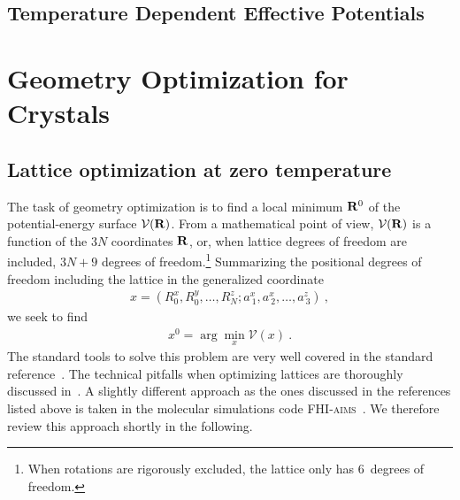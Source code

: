 
\section{Temperature Dependent Effective Potentials}

\chapter{Geometry Optimization for Crystals}
\section{Lattice optimization at zero temperature}
\label{sec:ltrm}
The task of geometry optimization is to find a local minimum ${\bf R}^0$ of the potential-energy surface $\mathcal{V} ({\bf R})$. From a mathematical point of view, $\mathcal V ({\bf R})$ is a function of the $3N$ coordinates ${\bf R}$, or, when lattice degrees of freedom are included, $3N + 9$ degrees of freedom.\footnote{When rotations are rigorously excluded, the lattice only has 6~degrees of freedom.} Summarizing the positional degrees of freedom including the lattice in the generalized coordinate
\begin{align}
x 
= \left( R_{0}^x, R_{0}^y, \ldots, R_{N}^z; a^x_{~1}, a^x_{~2}, \ldots, a^z_{~3} \right) ~,
\label{eq:opt.x}
\end{align}
we seek to find
\begin{align}
x^0 = \arg \min_x \mathcal V (x)~.
\end{align}
The standard tools to solve this problem are very well covered in the standard reference~\cite{nocedal2006}. The technical pitfalls when optimizing lattices are thoroughly discussed in~\cite{pfrommer1997,Tadmor1999}.
A slightly different approach as the ones discussed in the references listed above is taken in the molecular simulations code \textsc{FHI-aims}~\cite{FHI-aims}. We therefore review this approach shortly in the following.

